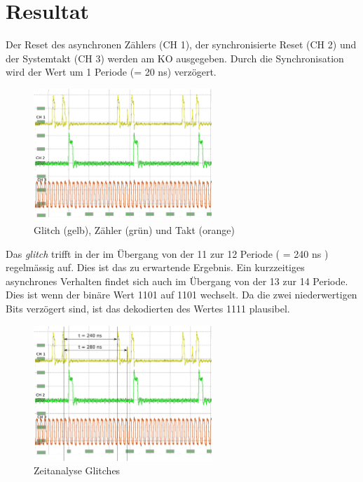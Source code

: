 \newpage
\section{Resultat }\label{sect.glitch_resultat}

Der Reset des asynchronen Zählers (CH 1), der synchronisierte Reset (CH 2) und der Systemtakt (CH 3) werden am KO ausgegeben. Durch die Synchronisation wird der Wert um 1 Periode (= 20 ns) verzögert.

\begin{figure}[H]
	\centering
	\includegraphics[width=0.6\textwidth]{images/glitch/Glitch_2_good.png}
	\caption{Glitch (gelb), Zähler (grün) und Takt (orange)}
	\label{fig.glitch.result_1}
\end{figure}

 Das \textit{glitch} trifft in der im Übergang von der 11 zur 12 Periode ( = 240 ns ) regelmässig auf. Dies ist das zu erwartende Ergebnis. Ein kurzzeitiges asynchrones Verhalten findet sich auch im Übergang von der 13 zur 14 Periode. Dies ist wenn der binäre Wert 1101 auf 1101 wechselt. Da die zwei niederwertigen Bits verzögert sind, ist das dekodierten des Wertes 1111 plausibel.\\
\begin{figure}[H]
	\centering
	\includegraphics[width=0.6\textwidth]{images/glitch/Glitch_2_timing.png}
	\caption{Zeitanalyse Glitches}
	\label{fig.glitch.result_2}
\end{figure}



